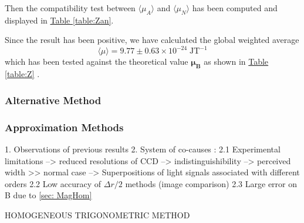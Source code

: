 \documentclass[a4paper,12pt,abstracton]{scrartcl}
\begin{document}
Then the compatibility test between $\langle \mu_A \rangle$ and $\langle \mu_N \rangle$ has been computed and displayed in \hyperref[table:Zan]{Table \ref*{table:Zan}}. 
\begin{table}[H]
\caption{}
\centering
{}
\label{table:Zan}
\end{table}

Since the result has been positive, we have calculated the global weighted average $$ \langle \mu\rangle=9.77 \pm  0.63\times 10^{-24}\;\text{JT}^{-1}$$ which has been tested against the theoretical value $\boldsymbol{\mu_B}$ as shown in \hyperref[table:Z]{Table \ref*{table:Z}} .

\begin{table}[H]
\caption{}
\centering
{}
\label{table:Z}
\end{table}

\subsubsection{Alternative Method}
 \subsubsection{Approximation Methods}
1. Observations of previous results 
2. System of co-causes : 
   2.1 Experimental limitations --> reduced resolutions of CCD --> indistinguishibility --> perceived width >> normal case --> Superpositions of light signals associated with different orders
   2.2 Low accuracy of $\Delta r /2$ methods (image comparison) 
   2.3 Large error on B due to \ref{sec: MagHom} 

   HOMOGENEOUS TRIGONOMETRIC METHOD 


\clearpage
\end{document}
